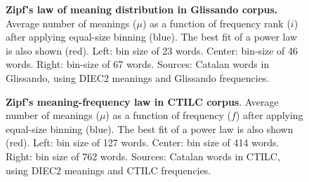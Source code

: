 \documentclass[10pt,letterpaper]{article}
\newif\ifarxiv
\begin{document}
\begin{figure}[!h]
\ifarxiv
\centering
\begin{minipage}{0.32\textwidth}
\centering
\texttt{[image: DIEC2\_GLISSANDO\_senseCG\_rank\_grup\_1\_one\_plot\_nou\_LS.png]}
\end{minipage}
\hspace*{\fill}
\begin{minipage}{0.32\textwidth}
\centering
\texttt{[image: DIEC2\_GLISSANDO\_senseCG\_rank\_grup\_5\_one\_plot\_nou\_LS.png]}
\end{minipage}
\hspace*{\fill}
\begin{minipage}{0.32\textwidth}
\centering
\texttt{[image: DIEC2\_GLISSANDO\_senseCG\_rank\_grup\_10\_one\_plot\_nou\_LS.png]}
\end{minipage}
\fi
\caption{\textbf{Zipf's law of meaning distribution in Glissando corpus. } 
Average number of meanings ($\mu$) as a function of frequency rank ($i$) after applying equal-size binning (blue). The best fit of a power law is also shown (red).
Left: bin size of 23 words. Center: bin-size of 46 words. Right: bin-size of 67 words. Sources: Catalan words in Glissando, using DIEC2 meanings and Glissando frequencies.}
\label{fig5}
\end{figure}

\begin{figure}[!h]
\ifarxiv
\begin{minipage}{0.32\textwidth}
\centering
\texttt{[image: DIEC2\_CTILC\_senseCG\_freq\_grup\_1\_one\_plot\_nou\_LS.png]}
\end{minipage}
\hspace*{\fill}
\begin{minipage}{0.32\textwidth}
\centering
\texttt{[image: DIEC2\_CTILC\_senseCG\_freq\_grup\_5\_one\_plot\_nou\_LS.png]}
\end{minipage}
\hspace*{\fill}
\begin{minipage}{0.32\textwidth}
\centering
\texttt{[image: DIEC2\_CTILC\_senseCG\_freq\_grup\_10\_one\_plot\_nou\_LS.png]}
\end{minipage}
\fi
\caption{\textbf{Zipf's meaning-frequency law in CTILC corpus}. Average number of meanings ($\mu$) as a function of frequency ($f$) after applying equal-size binning (blue). The best fit of a power law is also shown (red).
Left: bin size of 127 words. Center: bin size of 414 words. Right: bin size of 762 words. Sources: Catalan words in CTILC, using DIEC2 meanings and CTILC frequencies.}
\label{fig6}
\end{figure}
\end{document}
